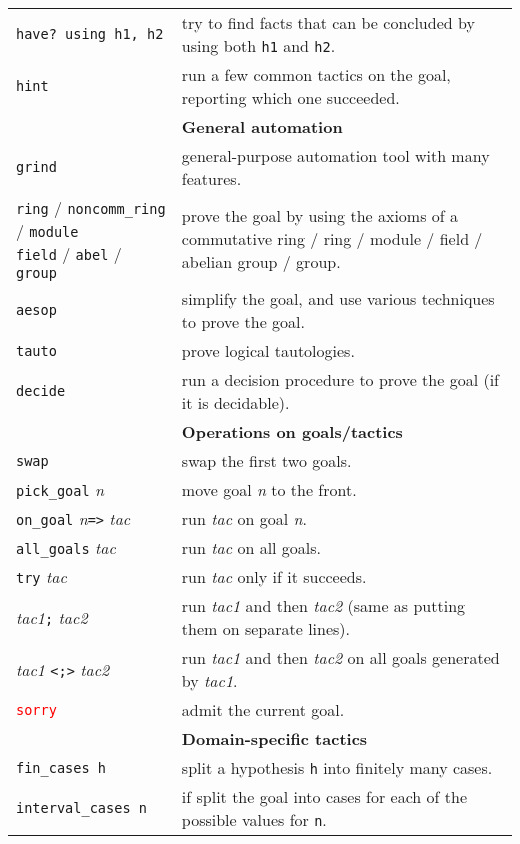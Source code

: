 \documentclass[a4paper]{article}
\newcommand{\lean}[1]{{\tt #1}}
\newcommand{\tactic}[1][]{\textit{tac#1}\xspace} %
\newcommand{\nat}{\textit{n}\xspace}
\begin{document}
\begin{center}
\begin{longtable}{@{}lp{113mm}@{}}
  \lean{have? using h1, h2} & try to find facts that can be concluded by using both \lean{h1} and \lean{h2}. \\
  \lean{hint} & run a few common tactics on the goal, reporting which one succeeded. \\
  \hline
  &\textbf{General automation}\\
  \lean{grind} & general-purpose automation tool with many features. \\
  \makecell[lt]{\lean{ring} / \lean{noncomm\_ring} / \lean{module} \\ \lean{field} / \lean{abel} / \lean{group}} & prove the goal by using the axioms of a commutative ring / ring / module / field / abelian group / group. \\
  \lean{aesop} & simplify the goal, and use various techniques to prove the goal. \\
  \lean{tauto} & prove logical tautologies. \\
  \lean{decide} & run a decision procedure to prove the goal (if it is decidable). \\
  \hline
  &\textbf{Operations on goals/tactics}\\
  \lean{swap} & swap the first two goals. \\
  \lean{pick\_goal} \nat & move goal \nat to the front. \\
  \lean{on\_goal} \nat \lean{=>} \tactic & run \tactic on goal \nat. \\
  \lean{all\_goals} \tactic & run \tactic on all goals. \\
  \lean{try} \tactic & run \tactic only if it succeeds. \\
  \tactic[1]\lean{;} \tactic[2] & run \tactic[1] and then \tactic[2] (same as putting them on separate lines). \\
  \tactic[1] \lean{<;>} \tactic[2] & run \tactic[1] and then \tactic[2] on all goals generated by \tactic[1]. \\
  \textcolor{red}{\lean{sorry}} & admit the current goal.\\
  \hline
  &\textbf{Domain-specific tactics}\\
  \lean{fin\_cases h} & split a hypothesis \lean{h} into finitely many cases. \\
  \lean{interval\_cases n} & if split the goal into cases for each of the possible values for \lean{n}.\\

\end{longtable}
\end{center}
\end{document}

